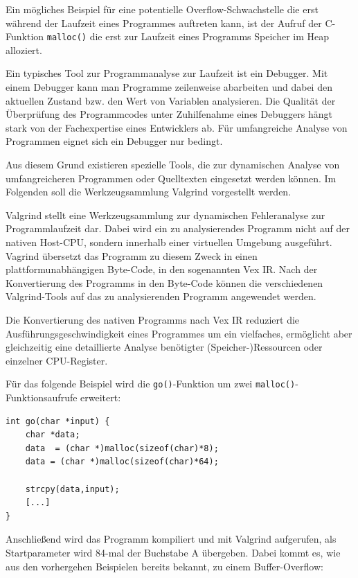 Ein mögliches Beispiel für eine potentielle Overflow-Schwachstelle die erst während der Laufzeit eines Programmes auftreten kann, ist der Aufruf der C-Funktion \texttt{malloc()} die erst zur Laufzeit eines Programms Speicher im Heap alloziert.

Ein typisches Tool zur Programmanalyse zur Laufzeit ist ein Debugger. Mit einem Debugger kann man Programme zeilenweise abarbeiten und dabei den aktuellen Zustand bzw. den Wert von Variablen analysieren. Die Qualität der Überprüfung des Programmcodes unter Zuhilfenahme eines Debuggers hängt stark von der Fachexpertise eines Entwicklers ab. Für umfangreiche Analyse von Programmen eignet sich ein Debugger nur bedingt.

Aus diesem Grund existieren spezielle Tools, die zur dynamischen Analyse von umfangreicheren Programmen oder Quelltexten eingesetzt werden können. Im Folgenden soll die Werkzeugsammlung Valgrind vorgestellt werden.


Valgrind stellt eine Werkzeugsammlung zur dynamischen Fehleranalyse zur Programmlaufzeit dar. Dabei wird ein zu analysierendes Programm nicht auf der nativen Host-CPU, sondern innerhalb einer virtuellen Umgebung ausgeführt.
Vagrind übersetzt das Programm zu diesem Zweck in einen plattformunabhängigen Byte-Code, in den sogenannten Vex IR. Nach der Konvertierung des Programms in den Byte-Code können die verschiedenen Valgrind-Tools auf das zu analysierenden Programm angewendet werden.

Die Konvertierung des nativen Programms nach Vex IR reduziert die Ausführungsgeschwindigkeit eines Programmes um ein vielfaches, ermöglicht aber gleichzeitig eine detaillierte Analyse  benötigter (Speicher-)Ressourcen oder einzelner CPU-Register.

Für das folgende Beispiel wird die \texttt{go()}-Funktion um zwei \texttt{malloc()}-Funktionsaufrufe erweitert:

\begin{lstlisting}[basicstyle=\ttfamily\footnotesize]
int go(char *input) {
    char *data;	
    data  = (char *)malloc(sizeof(char)*8);
    data = (char *)malloc(sizeof(char)*64);

    strcpy(data,input);
    [...]
}
\end{lstlisting}

Anschließend wird das Programm kompiliert und mit Valgrind aufgerufen, als Startparameter wird 84-mal der Buchstabe A übergeben. Dabei kommt es, wie aus den vorhergehen Beispielen bereits bekannt, zu einem Buffer-Overflow:


